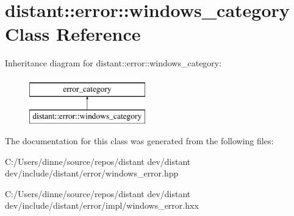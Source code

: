 \hypertarget{classdistant_1_1error_1_1windows__category}{}\section{distant\+:\+:error\+:\+:windows\+\_\+category Class Reference}
\label{classdistant_1_1error_1_1windows__category}
Inheritance diagram for distant\+:\+:error\+:\+:windows\+\_\+category\+:\begin{figure}[H]
\begin{center}
\leavevmode
\includegraphics[height=2.000000cm]{classdistant_1_1error_1_1windows__category}
\end{center}
\end{figure}


The documentation for this class was generated from the following files\+:\begin{DoxyCompactItemize}
\item 
C\+:/\+Users/dinne/source/repos/distant dev/distant dev/include/distant/error/windows\+\_\+error.\+hpp\item 
C\+:/\+Users/dinne/source/repos/distant dev/distant dev/include/distant/error/impl/windows\+\_\+error.\+hxx\end{DoxyCompactItemize}
